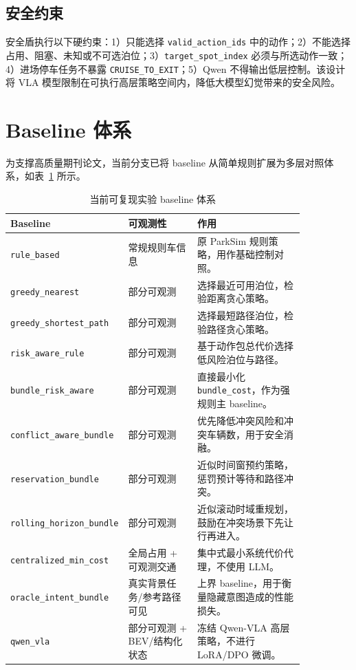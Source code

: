 \documentclass[conference]{IEEEtran}
\begin{document}
\subsection{安全约束}
安全盾执行以下硬约束：1）只能选择 \texttt{valid\_action\_ids} 中的动作；2）不能选择占用、阻塞、未知或不可选泊位；3）\texttt{target\_spot\_index} 必须与所选动作一致；4）进场停车任务不暴露 \texttt{CRUISE\_TO\_EXIT}；5）Qwen 不得输出低层控制。该设计将 VLA 模型限制在可执行高层策略空间内，降低大模型幻觉带来的安全风险。

\section{Baseline 体系}
为支撑高质量期刊论文，当前分支已将 baseline 从简单规则扩展为多层对照体系，如表~\ref{tab:baselines} 所示。

\begin{table}[htbp]
\caption{当前可复现实验 baseline 体系}
\label{tab:baselines}
\centering
\begin{tabular}{p{0.18\linewidth}p{0.27\linewidth}p{0.40\linewidth}}
\toprule
Baseline & 可观测性 & 作用 \\
\midrule
\texttt{rule\_based} & 常规规则车信息 & 原 ParkSim 规则策略，用作基础控制对照。 \\
\texttt{greedy\_nearest} & 部分可观测 & 选择最近可用泊位，检验距离贪心策略。 \\
\texttt{greedy\_shortest\_path} & 部分可观测 & 选择最短路径泊位，检验路径贪心策略。 \\
\texttt{risk\_aware\_rule} & 部分可观测 & 基于动作包总代价选择低风险泊位与路径。 \\
\texttt{bundle\_risk\_aware} & 部分可观测 & 直接最小化 \texttt{bundle\_cost}，作为强规则主 baseline。 \\
\texttt{conflict\_aware\_bundle} & 部分可观测 & 优先降低冲突风险和冲突车辆数，用于安全消融。 \\
\texttt{reservation\_bundle} & 部分可观测 & 近似时间窗预约策略，惩罚预计等待和路径冲突。 \\
\texttt{rolling\_horizon\_bundle} & 部分可观测 & 近似滚动时域重规划，鼓励在冲突场景下先让行再进入。 \\
\texttt{centralized\_min\_cost} & 全局占用 + 可观测交通 & 集中式最小系统代价代理，不使用 LLM。 \\
\texttt{oracle\_intent\_bundle} & 真实背景任务/参考路径可见 & 上界 baseline，用于衡量隐藏意图造成的性能损失。 \\
\texttt{qwen\_vla} & 部分可观测 + BEV/结构化状态 & 冻结 Qwen-VLA 高层策略，不进行 LoRA/DPO 微调。 \\
\bottomrule
\end{tabular}
\end{table}
\end{document}

